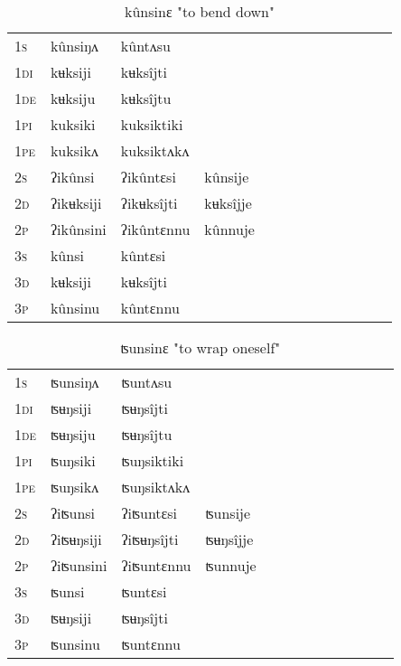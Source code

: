 \documentclass[oldfontcommands,oneside,a4paper,11pt]{article}
\begin{document}
\begin{table}[H]
\label{uk.vr} \centering 
\caption{kûnsinɛ  "to bend down"  }
\begin{tabular}{l|l|l|l|l|l|l|l|l|l|l|l|l}  \toprule
\textsc{1s} &kûnsiŋʌ &kûntʌsu \\ 
\textsc{1di} &kʉksiji &kʉksîjti   \\
\textsc{1de} &kʉksiju &kʉksîjtu   \\ 
\textsc{1pi} &kuksiki &kuksiktiki   \\ 
\textsc{1pe} &kuksikʌ &kuksiktʌkʌ   \\ 
\textsc{2s} & ʔikûnsi & ʔikûntɛsi &kûnsije  \\ 
\textsc{2d} & ʔikʉksiji & ʔikʉksîjti &kʉksîjje    \\
\textsc{2p} & ʔikûnsini  & ʔikûntɛnnu &kûnnuje  \\ 
\textsc{3s} & kûnsi & kûntɛsi   \\ 
\textsc{3d} & kʉksiji & kʉksîjti   \\ 
\textsc{3p} & kûnsinu  & kûntɛnnu \\ 
\bottomrule
\end{tabular}
\end{table}


\begin{table}[H]
\label{uŋ.vr} \centering 
\caption{ʦunsinɛ  "to wrap oneself"  }
\begin{tabular}{l|l|l|l|l|l|l|l|l|l|l|l|l}  \toprule
\textsc{1s} &ʦunsiŋʌ &ʦuntʌsu \\ 
\textsc{1di} &ʦʉŋsiji &ʦʉŋsîjti   \\
\textsc{1de} &ʦʉŋsiju &ʦʉŋsîjtu   \\ 
\textsc{1pi} &ʦuŋsiki &ʦuŋsiktiki   \\ 
\textsc{1pe} &ʦuŋsikʌ &ʦuŋsiktʌkʌ   \\ 
\textsc{2s} & ʔiʦunsi & ʔiʦuntɛsi &ʦunsije  \\ 
\textsc{2d} & ʔiʦʉŋsiji & ʔiʦʉŋsîjti &ʦʉŋsîjje    \\
\textsc{2p} & ʔiʦunsini  & ʔiʦuntɛnnu &ʦunnuje  \\ 
\textsc{3s} & ʦunsi & ʦuntɛsi   \\ 
\textsc{3d} & ʦʉŋsiji & ʦʉŋsîjti   \\ 
\textsc{3p} & ʦunsinu  & ʦuntɛnnu \\ 
\bottomrule
\end{tabular}
\end{table}
\end{document}
